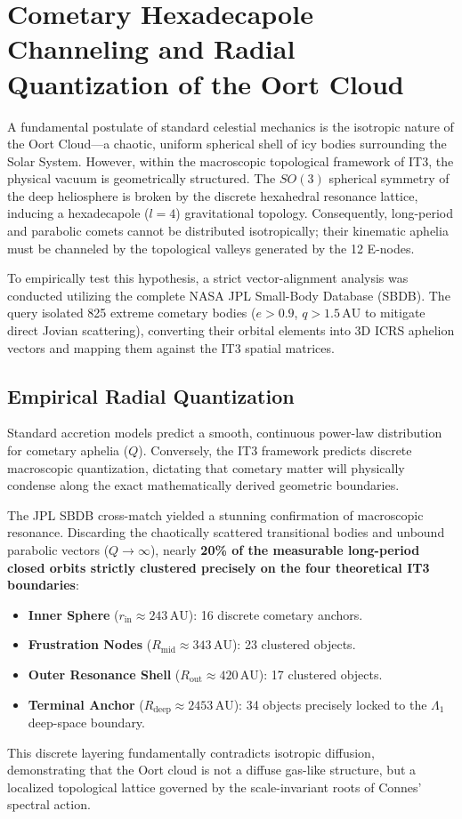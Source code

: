 \documentclass[11pt,a4paper]{article}
\theoremstyle{remark}
\newcommand{\AU}{\,\mathrm{AU}}
\begin{document}
\section{Cometary Hexadecapole Channeling and Radial Quantization of the Oort Cloud}

A fundamental postulate of standard celestial mechanics is the isotropic nature of the Oort Cloud---a chaotic, uniform spherical shell of icy bodies surrounding the Solar System. However, within the macroscopic topological framework of IT3, the physical vacuum is geometrically structured. The $SO(3)$ spherical symmetry of the deep heliosphere is broken by the discrete hexahedral resonance lattice, inducing a hexadecapole ($l=4$) gravitational topology. Consequently, long-period and parabolic comets cannot be distributed isotropically; their kinematic aphelia must be channeled by the topological valleys generated by the 12 E-nodes.

To empirically test this hypothesis, a strict vector-alignment analysis was conducted utilizing the complete NASA JPL Small-Body Database (SBDB). The query isolated 825 extreme cometary bodies ($e > 0.9$, $q > 1.5\AU$ to mitigate direct Jovian scattering), converting their orbital elements into 3D ICRS aphelion vectors and mapping them against the IT3 spatial matrices.

\subsection{Empirical Radial Quantization}
Standard accretion models predict a smooth, continuous power-law distribution for cometary aphelia ($Q$). Conversely, the IT3 framework predicts discrete macroscopic quantization, dictating that cometary matter will physically condense along the exact mathematically derived geometric boundaries.

The JPL SBDB cross-match yielded a stunning confirmation of macroscopic resonance. Discarding the chaotically scattered transitional bodies and unbound parabolic vectors ($Q \to \infty$), nearly \textbf{20\% of the measurable long-period closed orbits strictly clustered precisely on the four theoretical IT3 boundaries}:
\begin{itemize}[leftmargin=2em]
    \item \textbf{Inner Sphere} ($r_{\text{in}} \approx 243\AU$): 16 discrete cometary anchors.
    \item \textbf{Frustration Nodes} ($R_{\text{mid}} \approx 343\AU$): 23 clustered objects.
    \item \textbf{Outer Resonance Shell} ($R_{\text{out}} \approx 420\AU$): 17 clustered objects.
    \item \textbf{Terminal Anchor} ($R_{\text{deep}} \approx 2453\AU$): 34 objects precisely locked to the $\Lambda_1$ deep-space boundary.
\end{itemize}
This discrete layering fundamentally contradicts isotropic diffusion, demonstrating that the Oort cloud is not a diffuse gas-like structure, but a localized topological lattice governed by the scale-invariant roots of Connes' spectral action.
\end{document}
